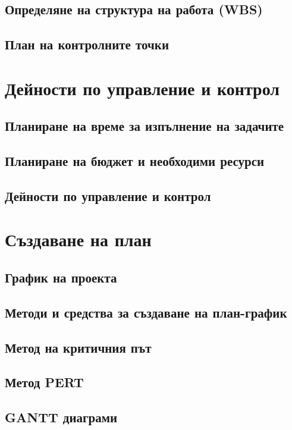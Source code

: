 \documentclass[fleqn,12pt]{article}
\begin{document}
\subsection{Определяне на структура на работа (WBS)}
\subsection{План на контролните точки}

\section{Дейности по управление и контрол}

\subsection{Планиране на време за изпълнение на задачите}
\subsection{Планиране на бюджет и необходими ресурси}
\subsection{Дейности по управление и контрол}

\section{Създаване на план}

\subsection{График на проекта}
\subsection{Методи и средства за създаване на план-график}
\subsection{Метод на критичния път}
\subsection{Метод PERT}
\subsection{GANTT диаграми}
\end{document}

